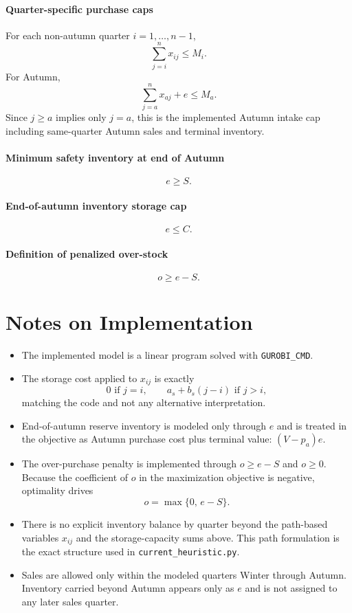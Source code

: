 \paragraph{Quarter-specific purchase caps}
For each non-autumn quarter $i=1,\dots,n-1$,
\[
\sum_{j=i}^{n} x_{ij} \le M_i.
\]
For Autumn,
\[
\sum_{j=a}^{n} x_{aj} + e \le M_a.
\]
Since $j \ge a$ implies only $j=a$, this is the implemented Autumn intake cap including same-quarter Autumn sales and terminal inventory.

\paragraph{Minimum safety inventory at end of Autumn}
\[
e \ge S.
\]

\paragraph{End-of-autumn inventory storage cap}
\[
e \le C.
\]

\paragraph{Definition of penalized over-stock}
\[
o \ge e - S.
\]

\section*{Notes on Implementation}

\begin{itemize}
    \item The implemented model is a linear program solved with \texttt{GUROBI\_CMD}.
    \item The storage cost applied to $x_{ij}$ is exactly
    \[
    0 \text{ if } j=i,\qquad a_s+b_s(j-i) \text{ if } j>i,
    \]
    matching the code and not any alternative interpretation.
    \item End-of-autumn reserve inventory is modeled only through $e$ and is treated in the objective as Autumn purchase cost plus terminal value: $(V-p_a)e$.
    \item The over-purchase penalty is implemented through $o \ge e-S$ and $o \ge 0$. Because the coefficient of $o$ in the maximization objective is negative, optimality drives
    \[
    o = \max\{0,\,e-S\}.
    \]
    \item There is no explicit inventory balance by quarter beyond the path-based variables $x_{ij}$ and the storage-capacity sums above. This path formulation is the exact structure used in \texttt{current\_heuristic.py}.
    \item Sales are allowed only within the modeled quarters Winter through Autumn. Inventory carried beyond Autumn appears only as $e$ and is not assigned to any later sales quarter.
\end{itemize}

